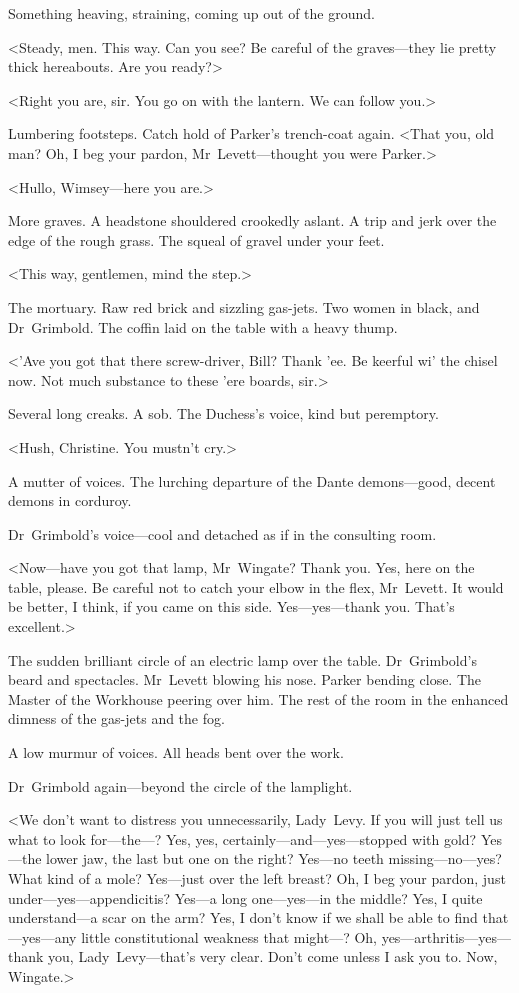 Something heaving, straining, coming up out of the ground.

<Steady, men. This way. Can you see? Be careful of the graves—they lie pretty thick hereabouts. Are you ready?>

<Right you are, sir. You go on with the lantern. We can follow you.>

Lumbering footsteps. Catch hold of Parker's trench-coat again. <That you, old man? Oh, I beg your pardon, Mr~Levett—thought you were Parker.>

<Hullo, Wimsey—here you are.>

More graves. A headstone shouldered crookedly aslant. A trip and jerk over the edge of the rough grass. The squeal of gravel under your feet.

<This way, gentlemen, mind the step.>

The mortuary. Raw red brick and sizzling gas-jets. Two women in black, and Dr~Grimbold. The coffin laid on the table with a heavy thump.

<'Ave you got that there screw-driver, Bill? Thank 'ee. Be keerful wi' the chisel now. Not much substance to these 'ere boards, sir.>

Several long creaks. A sob. The Duchess's voice, kind but peremptory.

<Hush, Christine. You mustn't cry.>

A mutter of voices. The lurching departure of the Dante demons—good, decent demons in corduroy.

Dr~Grimbold's voice—cool and detached as if in the consulting room.

<Now—have you got that lamp, Mr~Wingate? Thank you. Yes, here on the table, please. Be careful not to catch your elbow in the flex, Mr~Levett. It would be better, I think, if you came on this side. Yes—yes—thank you. That's excellent.>

The sudden brilliant circle of an electric lamp over the table. Dr~Grimbold's beard and spectacles. Mr~Levett blowing his nose. Parker bending close. The Master of the Workhouse peering over him. The rest of the room in the enhanced dimness of the gas-jets and the fog.

A low murmur of voices. All heads bent over the work.

Dr~Grimbold again—beyond the circle of the lamplight.

<We don't want to distress you unnecessarily, Lady~Levy. If you will just tell us what to look for—the—? Yes, yes, certainly—and—yes—stopped with gold? Yes—the lower jaw, the last but one on the right? Yes—no teeth missing—no—yes? What kind of a mole? Yes—just over the left breast? Oh, I beg your pardon, just under—yes—ap\-pen\-dici\-tis? Yes—a long one—yes—in the middle? Yes, I quite understand—a scar on the arm? Yes, I don't know if we shall be able to find that—yes—any little constitutional weakness that might—? Oh, yes—arthritis—yes—thank you, Lady~Levy—that's very clear. Don't come unless I ask you to. Now, Wingate.>

